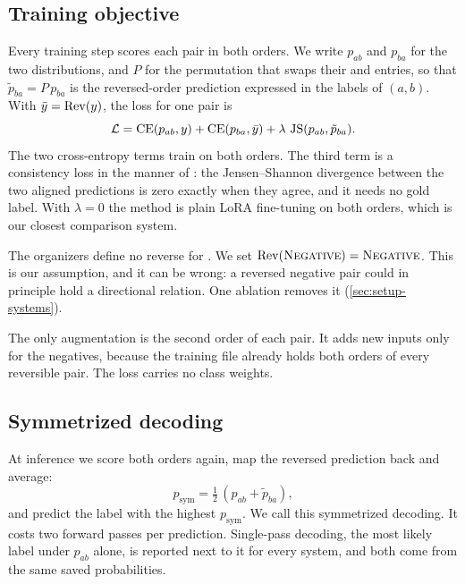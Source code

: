 \subsection{Training objective}
\label{sec:method-loss}

Every training step scores each pair in both orders. We write $p_{ab}$ and $p_{ba}$ for the two distributions, and $P$ for the permutation that swaps their \FW{} and \BW{} entries, so that $\tilde{p}_{ba} = P\,p_{ba}$ is the reversed-order prediction expressed in the labels of $(a,b)$. With $\bar{y} = \operatorname{Rev}(y)$, the loss for one pair is
\begin{equation}
\mathcal{L} = \operatorname{CE}(p_{ab}, y) + \operatorname{CE}(p_{ba}, \bar{y}) + \lambda\, \operatorname{JS}(p_{ab}, \tilde{p}_{ba}) .
\label{eq:loss}
\end{equation}
The two cross-entropy terms train on both orders. The third term is a consistency loss in the manner of \citet{li-etal-2019-logic}: the Jensen--Shannon divergence between the two aligned predictions is zero exactly when they agree, and it needs no gold label. With $\lambda = 0$ the method is plain LoRA fine-tuning on both orders, which is our closest comparison system.

The organizers define no reverse for \NO{}. We set $\operatorname{Rev}(\textsc{Negative}) = \textsc{Negative}$. This is our assumption, and it can be wrong: a reversed negative pair could in principle hold a directional relation. One ablation removes it (\cref{sec:setup-systems}).

The only augmentation is the second order of each pair. It adds new inputs only for the negatives, because the training file already holds both orders of every reversible pair. The loss carries no class weights.

\subsection{Symmetrized decoding}
\label{sec:method-decoding}

At inference we score both orders again, map the reversed prediction back and average:
\begin{equation}
p_{\mathrm{sym}} = \tfrac{1}{2}\,(p_{ab} + \tilde{p}_{ba}),
\label{eq:sym}
\end{equation}
and predict the label with the highest $p_{\mathrm{sym}}$. We call this symmetrized decoding. It costs two forward passes per prediction. Single-pass decoding, the most likely label under $p_{ab}$ alone, is reported next to it for every system, and both come from the same saved probabilities.

